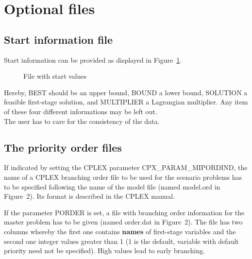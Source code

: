 \documentclass[11pt,draft]{article}
\newcommand{\+}{{\ti{+}}}
\newcommand{\1}{{\ti{1}}}
\begin{document}
\section{Optional files}
\subsection{Start information file} \label{S:START}
Start information can be provided as displayed in Figure~\ref{F:START}.
%
\begin{figure}[ht]
\begin{center}
\end{center} \caption{File with start values} \label{F:START}
\end{figure}
%
Hereby, BEST should be an upper bound, BOUND a lower bound, SOLUTION a feasible first-stage
solution, and MULTIPLIER a Lagrangian multiplier. Any item of these four different informations may be
left out.\\
The user has to care for the consistency of the data. 

\subsection{The priority order files} \label{S:ORDER}
If indicated by setting the CPLEX parameter CPX\_PARAM\_MIPORDIND, the name of a CPLEX branching order file to be used for the scenario
problems has to be specified following the name of the model file (named model.ord in Figure~2). Its format is described in the CPLEX manual.

If the parameter PORDER is set, a file with branching order information for the master problem has to be given (named order.dat in Figure~2).
The file has two columns whereby the first one contains {\bf names} of first-stage variables and
the second one integer values greater than 1 (1 is the default, variable with default priority need not be specified). High values lead to early branching. 
\end{document}
